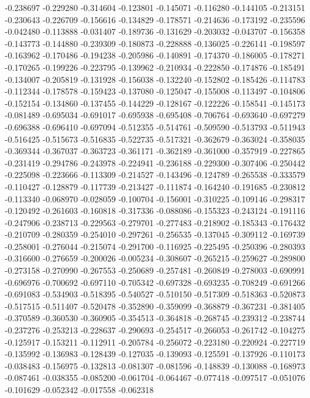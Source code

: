 -0.238697
-0.229280
-0.314604
-0.123801
-0.145071
-0.116280
-0.144105
-0.213151
-0.230643
-0.226709
-0.156616
-0.134829
-0.178571
-0.214636
-0.173192
-0.235596
-0.042480
-0.113888
-0.031407
-0.189736
-0.131629
-0.203032
-0.043707
-0.156358
-0.143773
-0.144880
-0.239309
-0.180873
-0.228888
-0.136025
-0.226141
-0.198597
-0.163962
-0.170486
-0.194238
-0.205986
-0.140891
-0.174370
-0.186005
-0.178271
-0.170265
-0.199226
-0.223795
-0.139962
-0.210934
-0.222850
-0.174876
-0.185491
-0.134007
-0.205819
-0.131928
-0.156038
-0.132240
-0.152802
-0.185426
-0.114783
-0.112344
-0.178578
-0.159423
-0.137080
-0.125047
-0.155008
-0.113497
-0.104806
-0.152154
-0.134860
-0.137455
-0.144229
-0.128167
-0.122226
-0.158541
-0.145173
-0.081489
-0.695034
-0.691017
-0.695938
-0.695408
-0.706764
-0.693640
-0.697279
-0.696388
-0.696410
-0.697094
-0.512355
-0.514761
-0.509590
-0.513793
-0.511943
-0.516425
-0.515673
-0.516835
-0.522735
-0.517321
-0.362679
-0.363024
-0.358035
-0.369344
-0.367037
-0.363723
-0.361171
-0.362189
-0.361000
-0.357919
-0.227865
-0.231419
-0.294786
-0.243978
-0.224941
-0.236188
-0.229300
-0.307406
-0.250442
-0.225098
-0.223666
-0.113309
-0.214527
-0.143496
-0.124789
-0.265538
-0.333579
-0.110427
-0.128879
-0.117739
-0.213427
-0.111874
-0.164240
-0.191685
-0.230812
-0.113340
-0.068970
-0.028059
-0.100704
-0.156001
-0.310225
-0.109146
-0.298317
-0.120492
-0.261603
-0.160818
-0.317336
-0.088086
-0.155323
-0.243124
-0.191116
-0.247906
-0.238713
-0.229563
-0.279701
-0.277483
-0.218902
-0.185343
-0.176432
-0.210709
-0.280359
-0.254010
-0.297261
-0.256535
-0.137045
-0.309112
-0.169739
-0.258001
-0.276044
-0.215074
-0.291700
-0.116925
-0.225495
-0.250396
-0.280393
-0.316600
-0.276659
-0.200026
-0.005234
-0.308607
-0.265215
-0.259627
-0.289800
-0.273158
-0.270990
-0.267553
-0.250689
-0.257481
-0.260849
-0.278003
-0.690991
-0.696976
-0.700692
-0.697110
-0.705342
-0.697328
-0.693235
-0.708249
-0.691266
-0.691083
-0.534903
-0.518395
-0.540527
-0.510150
-0.517309
-0.518363
-0.520873
-0.517515
-0.511407
-0.520478
-0.352890
-0.359099
-0.368879
-0.367231
-0.381405
-0.370589
-0.360530
-0.360905
-0.354513
-0.364818
-0.268745
-0.239312
-0.238744
-0.237276
-0.253213
-0.228637
-0.290693
-0.254517
-0.266053
-0.261742
-0.104275
-0.125917
-0.153211
-0.112911
-0.205784
-0.256072
-0.223180
-0.220924
-0.227719
-0.135992
-0.136983
-0.128439
-0.127035
-0.139093
-0.125591
-0.137926
-0.110173
-0.038483
-0.156975
-0.132813
-0.081307
-0.081596
-0.148839
-0.130088
-0.168973
-0.087461
-0.038355
-0.085200
-0.061704
-0.064467
-0.077418
-0.097517
-0.051076
-0.101629
-0.052342
-0.017558
-0.062318

